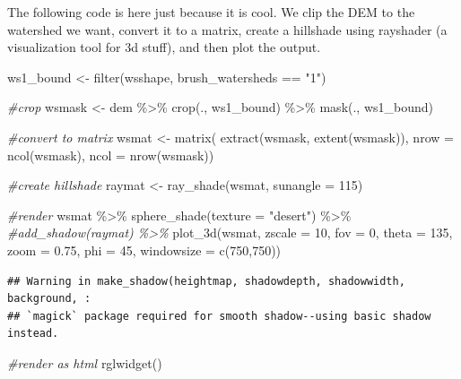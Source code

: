 \documentclass[
]{book}
\newenvironment{Shaded}{\begin{snugshade}}{\end{snugshade}}
\newcommand{\AttributeTok}[1]{\textcolor[rgb]{0.77,0.63,0.00}{#1}}
\newcommand{\CommentTok}[1]{\textcolor[rgb]{0.56,0.35,0.01}{\textit{#1}}}
\newcommand{\DecValTok}[1]{\textcolor[rgb]{0.00,0.00,0.81}{#1}}
\newcommand{\FloatTok}[1]{\textcolor[rgb]{0.00,0.00,0.81}{#1}}
\newcommand{\FunctionTok}[1]{\textcolor[rgb]{0.00,0.00,0.00}{#1}}
\newcommand{\NormalTok}[1]{#1}
\newcommand{\OtherTok}[1]{\textcolor[rgb]{0.56,0.35,0.01}{#1}}
\newcommand{\SpecialCharTok}[1]{\textcolor[rgb]{0.00,0.00,0.00}{#1}}
\newcommand{\StringTok}[1]{\textcolor[rgb]{0.31,0.60,0.02}{#1}}
\begin{document}
The following code is here just because it is cool. We clip the DEM to the watershed we want, convert it to a matrix, create a hillshade using rayshader (a visualization tool for 3d stuff), and then plot the output.

\begin{Shaded}
\begin{Highlighting}[]
\NormalTok{ws1\_bound }\OtherTok{\textless{}{-}} \FunctionTok{filter}\NormalTok{(wsshape, brush\_watersheds }\SpecialCharTok{==} \StringTok{"1"}\NormalTok{)}

\CommentTok{\#crop}
\NormalTok{wsmask }\OtherTok{\textless{}{-}}\NormalTok{ dem }\SpecialCharTok{\%\textgreater{}\%}
  \FunctionTok{crop}\NormalTok{(., ws1\_bound) }\SpecialCharTok{\%\textgreater{}\%}
  \FunctionTok{mask}\NormalTok{(., ws1\_bound)}

\CommentTok{\#convert to matrix}
\NormalTok{wsmat }\OtherTok{\textless{}{-}} \FunctionTok{matrix}\NormalTok{(}
  \FunctionTok{extract}\NormalTok{(wsmask, }\FunctionTok{extent}\NormalTok{(wsmask)),}
  \AttributeTok{nrow =} \FunctionTok{ncol}\NormalTok{(wsmask),}
  \AttributeTok{ncol =} \FunctionTok{nrow}\NormalTok{(wsmask))}

\CommentTok{\#create hillshade}
\NormalTok{raymat }\OtherTok{\textless{}{-}} \FunctionTok{ray\_shade}\NormalTok{(wsmat, }\AttributeTok{sunangle =} \DecValTok{115}\NormalTok{)}

\CommentTok{\#render}
\NormalTok{wsmat }\SpecialCharTok{\%\textgreater{}\%}
  \FunctionTok{sphere\_shade}\NormalTok{(}\AttributeTok{texture =} \StringTok{"desert"}\NormalTok{) }\SpecialCharTok{\%\textgreater{}\%}
  \CommentTok{\#add\_shadow(raymat) \%\textgreater{}\%}
  \FunctionTok{plot\_3d}\NormalTok{(wsmat, }\AttributeTok{zscale =} \DecValTok{10}\NormalTok{, }\AttributeTok{fov =} \DecValTok{0}\NormalTok{, }\AttributeTok{theta =} \DecValTok{135}\NormalTok{, }\AttributeTok{zoom =} \FloatTok{0.75}\NormalTok{, }\AttributeTok{phi =} \DecValTok{45}\NormalTok{,}
          \AttributeTok{windowsize =} \FunctionTok{c}\NormalTok{(}\DecValTok{750}\NormalTok{,}\DecValTok{750}\NormalTok{))}
\end{Highlighting}
\end{Shaded}

\begin{verbatim}
## Warning in make_shadow(heightmap, shadowdepth, shadowwidth, background, :
## `magick` package required for smooth shadow--using basic shadow instead.
\end{verbatim}

\begin{Shaded}
\begin{Highlighting}[]
\CommentTok{\#render as html}
\FunctionTok{rglwidget}\NormalTok{()}
\end{Highlighting}
\end{Shaded}
\end{document}

